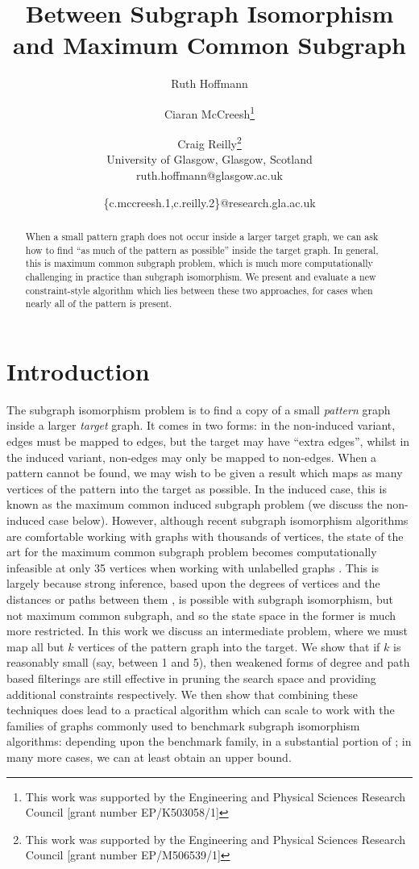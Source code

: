 \documentclass[letterpaper]{article}
\title{Between Subgraph Isomorphism and Maximum Common Subgraph}
\author{Ruth Hoffmann \and Ciaran McCreesh\thanks{This work was supported by the Engineering and Physical Sciences
Research Council [grant number EP/K503058/1]} \and Craig Reilly\thanks{This work was supported by the Engineering and Physical Sciences Research Council [grant number EP/M506539/1]} \\
University of Glasgow, Glasgow, Scotland \\
ruth.hoffmann@glasgow.ac.uk \and \{c.mccreesh.1,c.reilly.2\}@research.gla.ac.uk}
\newcommand{\citep}[1]{\cite{#1}}
\theoremstyle{definition}
\begin{document}
\maketitle

\begin{abstract}
    When a small pattern graph does not occur inside a larger target graph, we can ask how to find
    ``as much of the pattern as possible'' inside the target graph. In general, this is maximum
    common subgraph problem, which is much more computationally challenging in practice than
    subgraph isomorphism. We present and evaluate a new constraint-style algorithm which lies
    between these two approaches, for cases when nearly all of the pattern is present.
\end{abstract}

\section{Introduction}

The subgraph isomorphism problem is to find a copy of a small \emph{pattern} graph inside a larger
\emph{target} graph. It comes in two forms: in the non-induced variant, edges must be mapped to
edges, but the target may have ``extra edges'', whilst in the induced variant, non-edges may only be
mapped to non-edges. When a pattern cannot be found, we may wish to be given a result which maps as
many vertices of the pattern into the target as possible. In the induced case, this is known as the
maximum common induced subgraph problem (we discuss the non-induced case below). However, although
recent subgraph isomorphism algorithms are comfortable working with graphs with thousands of
vertices, the state of the art for the maximum common subgraph problem becomes computationally
infeasible at only 35 vertices when working with unlabelled graphs \citep{CP2016MCSPaper}. This is
largely because strong inference, based upon the degrees of vertices
\citep{DBLP:journals/ai/Solnon10} and the distances or paths between them
\citep{DBLP:conf/cp/AudemardLMGP14,DBLP:conf/cp/McCreeshP15}, is possible with subgraph isomorphism,
but not maximum common subgraph, and so the state space in the former is much more restricted. In
this work we discuss an intermediate problem, where we must map all but $k$ vertices of the pattern
graph into the target. We show that if $k$ is reasonably small (say, between 1 and 5), then weakened
forms of degree and path based filterings are still effective in pruning the search space and
providing additional constraints respectively. We then show that combining these techniques does
lead to a practical algorithm which can scale to work with the families of graphs commonly used to
benchmark subgraph isomorphism algorithms: depending upon the benchmark family, in a substantial
portion of ; in many more cases, we can at least obtain an upper bound.
\end{document}
